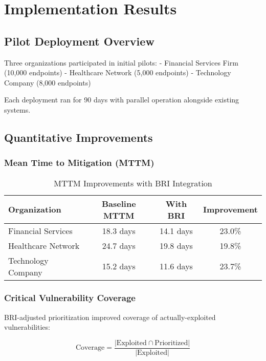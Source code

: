\documentclass[11pt,a4paper]{article}
\begin{document}
\section{Implementation Results}

\subsection{Pilot Deployment Overview}

Three organizations participated in initial pilots:
- Financial Services Firm (10,000 endpoints)
- Healthcare Network (5,000 endpoints)  
- Technology Company (8,000 endpoints)

Each deployment ran for 90 days with parallel operation alongside existing systems.

\subsection{Quantitative Improvements}

\subsubsection{Mean Time to Mitigation (MTTM)}

\begin{table}[h!]
\centering
\caption{MTTM Improvements with BRI Integration}
\label{tab:mttm}
\begin{tabular}{lccc}
\toprule
Organization & Baseline MTTM & With BRI & Improvement \\
\midrule
Financial Services & 18.3 days & 14.1 days & 23.0\% \\
Healthcare Network & 24.7 days & 19.8 days & 19.8\% \\
Technology Company & 15.2 days & 11.6 days & 23.7\% \\
\bottomrule
\end{tabular}
\end{table}

\subsubsection{Critical Vulnerability Coverage}

BRI-adjusted prioritization improved coverage of actually-exploited vulnerabilities:

\begin{equation}
\text{Coverage} = \frac{|\text{Exploited} \cap \text{Prioritized}|}{|\text{Exploited}|}
\end{equation}
\end{document}
